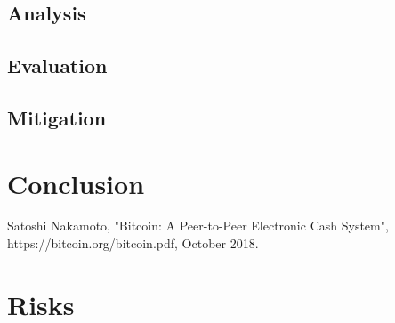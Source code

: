 \documentclass[11pt,a4paper,draft]{article}
\begin{document}
\subsection{Analysis}

\subsection{Evaluation}

\subsection{Mitigation}

\section{Conclusion}

\newpage
\begin{thebibliography}{9}

Satoshi Nakamoto,
"Bitcoin: A Peer-to-Peer Electronic Cash System",
https://bitcoin.org/bitcoin.pdf,
October 2018.

\end{thebibliography}

\newpage
\appendix

\section{Risks}
\end{document}

